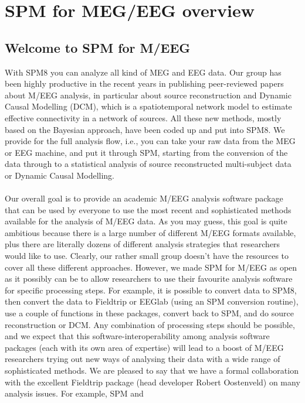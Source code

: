 \chapter{SPM for MEG/EEG overview \label{Chap:eeg:overview}}

\section{Welcome to SPM for M/EEG}
With SPM8 you can analyze all kind of MEG
and EEG data. Our group has been highly productive in the recent years
in publishing peer-reviewed papers about M/EEG analysis, in particular
about source reconstruction and Dynamic Causal Modelling (DCM), which
is a spatiotemporal network model to estimate effective connectivity
in a network of sources. All these new methods, mostly based on the
Bayesian approach, have been coded up and put into SPM8. We
provide for the full analysis flow, i.e., you can take your raw data
from the MEG or EEG machine, and put it through SPM, starting from the
conversion of the data through to a statistical analysis of source
reconstructed multi-subject data or Dynamic Causal Modelling.
\\
\\
Our overall goal is to provide an academic M/EEG analysis software
package that can be used by everyone to use the most recent and
sophisticated methods available for the analysis of M/EEG data. As you
may guess, this goal is quite ambitious because there is a large
number of different M/EEG formats available, plus there are literally
dozens of different analysis strategies that researchers would like to
use. Clearly, our rather small group doesn't have the resources
to cover all these different approaches. However, we made SPM for
M/EEG as open as it possibly can be to allow researchers to use
their favourite analysis software for specific processing steps. For
example, it is possible to convert data to SPM8, then convert the data
to Fieldtrip or EEGlab (using an SPM conversion routine), use a couple
of functions in these packages, convert back to SPM, and do source
reconstruction or DCM. Any combination of processing steps should be
possible, and we expect that this 
software-interoperability among analysis software packages (each with
its own area of expertise) will lead to a boost of M/EEG researchers
trying out new ways of analysing their data with a wide range of
sophisticated methods. We are pleased to say that we have a formal
collaboration with the excellent Fieldtrip package (head developer
Robert Oostenveld) on many analysis issues. For example, SPM and
